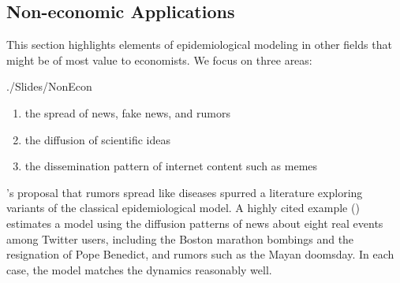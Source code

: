 \subsection{Non-economic Applications}\label{subsec:nonecon}\hypertarget{nonecon}{}

This section highlights elements of epidemiological modeling in other fields that might be of most value to economists.     We focus on three areas:
\begin{verbatimwrite}{./Slides/NonEcon}
  \begin{enumerate}
  \item the spread of news, fake news, and rumors
  \item the diffusion of scientific ideas
  \item the dissemination pattern of internet content such as memes
  \end{enumerate}
\end{verbatimwrite}



\cite{daley1964epidemics}'s proposal that rumors spread like diseases spurred a literature exploring variants of the classical epidemiological model.  A highly cited example (\cite{jin2013epidemiological}) 
estimates a model using the diffusion patterns of news about eight real events among Twitter users, including the Boston marathon bombings  and the resignation of Pope Benedict, and rumors such as the Mayan doomsday.  In each case, the model matches the dynamics reasonably well. 

